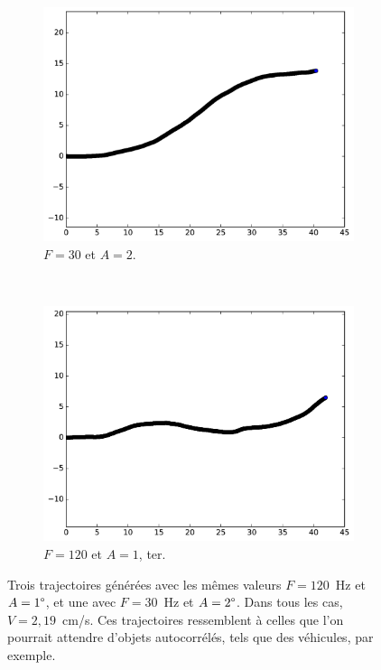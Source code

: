 \begin{figure}[!htb]
\begin{subfigure}[t]{0.49\textwidth}
			\centering
			\includegraphics[width=\textwidth]{figures/ch3/ac_2_19_2_30}
			\caption[Mouvement pseudo-autocorrélé B]{$F = 30$ et $A = 2$.}
			\label{fig:ac_2_30}
		\end{subfigure}		
		~
		\begin{subfigure}[t]{0.49\textwidth}
			\centering
			\includegraphics[width=\textwidth]{figures/ch3/ac_2_19_2_60}
			\caption[Mouvement pseudo-autocorrélé B]{$F = 120$ et $A = 1$, ter.}
			\label{fig:ac_1_120C}
		\end{subfigure}
		\caption[Mouvements pseudo-autocorrélés]{Trois trajectoires générées avec les mêmes valeurs $F = 120$~Hz et $A = 1\degree$, et une avec $F = 30$~Hz et $A = 2\degree$. Dans tous les cas, $V = 2,19$~cm/s. Ces trajectoires ressemblent à celles que l'on pourrait attendre d'objets autocorrélés, tels que des véhicules, par exemple.}
		\label{fig:autocorr}
	\end{figure}
    
